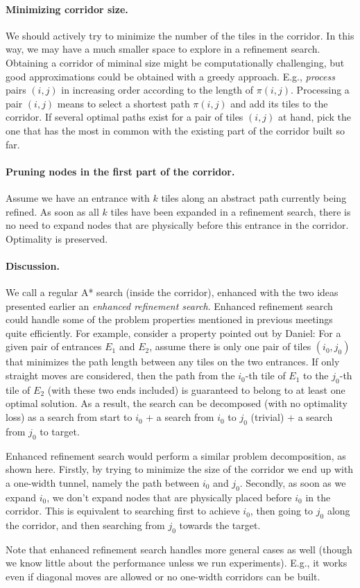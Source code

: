 \paragraph{Minimizing corridor size.}
We should actively try to minimize the number of the tiles in the corridor.
In this way, we may have a much smaller space to explore in a refinement search.
Obtaining a corridor of miminal size might be computationally challenging,
but good approximations could be obtained with a greedy approach.
E.g., \emph{process} pairs $(i,j)$ in increasing order according to the length of $\pi(i,j)$.
Processing a pair $(i,j)$ means to select a shortest path $\pi(i,j)$ and
add its tiles to the corridor.
If several optimal paths exist for a pair of tiles $(i,j)$ at hand,
pick the one that has the most in common with the existing part
of the corridor built so far.

\paragraph{Pruning nodes in the first part of the corridor.}
Assume we have an entrance with $k$ tiles
along an abstract path currently being refined.
As soon as all $k$ tiles have been expanded in a refinement search, there is no need
to expand nodes that are physically before this entrance in the corridor.
Optimality is preserved.

\paragraph{Discussion.}
We call a regular A* search (inside the corridor), enhanced with the two ideas
presented earlier an \emph{enhanced refinement search}.
Enhanced refinement search could handle some of the problem properties
mentioned in previous meetings quite efficiently.
For example, consider a property pointed out by Daniel:
For a given pair of entrances $E_1$ and $E_2$, assume there is only
one pair of tiles $(i_0, j_0)$ that minimizes the path length
between any tiles on the two entrances.
If only straight moves are considered, then
the path from the $i_0$-th tile of $E_1$
to the $j_0$-th tile of $E_2$
(with these two ends included) is guaranteed
to belong to at least one optimal solution.
As a result, the search can be decomposed (with no optimality loss) as
a search from start to $i_0$ + a search from $i_0$ to $j_0$ (trivial) + a search from $j_0$ to target.

Enhanced refinement search would perform a similar problem decomposition,
as shown here.
Firstly,
by trying to minimize the size of the corridor we end up with a one-width tunnel,
namely the path between $i_0$ and $j_0$.
Secondly, as soon as we expand $i_0$, 
we don't expand nodes that are physically placed before $i_0$ in the corridor.
This is equivalent to searching first to achieve $i_0$, 
then going to $j_0$ along the corridor,
and then searching
from $j_0$ towards the target.

Note that enhanced refinement search handles more general cases as well
(though we know little about the performance unless we run experiments).
E.g., it works even if diagonal moves are allowed or
no one-width corridors can be built.

